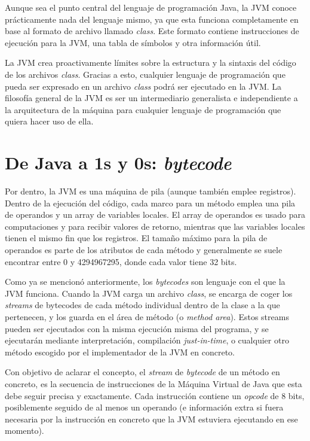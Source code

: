 \documentclass[english,runningheads,a4paper]{llncs}[2018/03/10]
\begin{document}
Aunque sea el punto central del lenguaje de programación Java, la JVM conoce
prácticamente nada del lenguaje mismo, ya que esta funciona completamente en
base al formato de archivo llamado \textit{class}. Este formato contiene
instrucciones de ejecución para la JVM, una tabla de símbolos y otra información
útil.

La JVM crea proactivamente límites sobre la estructura y la sintaxis del código
de los archivos \textit{class}. Gracias a esto, cualquier lenguaje de
programación que pueda ser expresado en un archivo \textit{class} podrá ser
ejecutado en la JVM. La filosofía general de la JVM es ser un intermediario
generalista e independiente a la arquitectura de la máquina para cualquier
lenguaje de programación que quiera hacer uso de ella.

\section*{De Java a 1s y 0s: \textit{bytecode}}
Por dentro, la JVM es una máquina de pila (aunque también emplee registros).
Dentro de la ejecución del código, cada marco para un método emplea una pila de
operandos y un array de variables locales. El array de operandos es usado para
computaciones y para recibir valores de retorno, mientras que las variables
locales tienen el mismo fin que los registros. El tamaño máximo para la pila de
operandos es parte de los atributos de cada método y generalmente se suele
encontrar entre 0 y 4294967295, donde cada valor tiene 32 bits.

Como ya se mencionó anteriormente, los \textit{bytecodes} son lenguaje con el
que la JVM funciona. Cuando la JVM carga un archivo \textit{class}, se encarga
de coger los \textit{streams} de bytecodes de cada método individual dentro de
la clase a la que pertenecen, y los guarda en el área de método (o
\textit{method area}). Estos streams pueden ser ejecutados con la misma
ejecución misma del programa, y se ejecutarán mediante interpretación,
compilación \textit{just-in-time}, o cualquier otro método escogido por el
implementador de la JVM en concreto.

Con objetivo de aclarar el concepto, el \textit{stream} de \textit{bytecode} de
un método en concreto, es la secuencia de instrucciones de la Máquina Virtual de
Java que esta debe seguir precisa y exactamente. Cada instrucción contiene un
\textit{opcode} de 8 bits, posiblemente seguido de al menos un operando (e
información extra si fuera necesaria por la instrucción en concreto que la JVM
estuviera ejecutando en ese momento).
\end{document}
